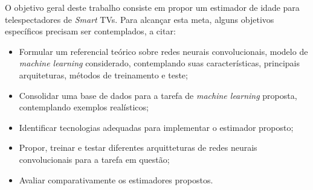 O objetivo geral deste trabalho consiste em propor um estimador de idade para telespectadores de \emph{Smart} TVs. Para alcançar esta meta, alguns objetivos específicos precisam ser contemplados, a citar:

\begin{itemize}
     \item Formular um referencial teórico sobre redes neurais convolucionais, modelo de \emph{machine learning} considerado, contemplando suas características, principais arquiteturas, métodos de treinamento e teste;
     \item Consolidar uma base de dados para a tarefa de \emph{machine learning} proposta, contemplando exemplos realísticos;
     \item Identificar tecnologias adequadas para implementar o estimador proposto;
     \item Propor, treinar e testar diferentes arquitteturas  de redes neurais convolucionais para a tarefa em questão;
     \item Avaliar comparativamente os estimadores propostos.
\end{itemize}
